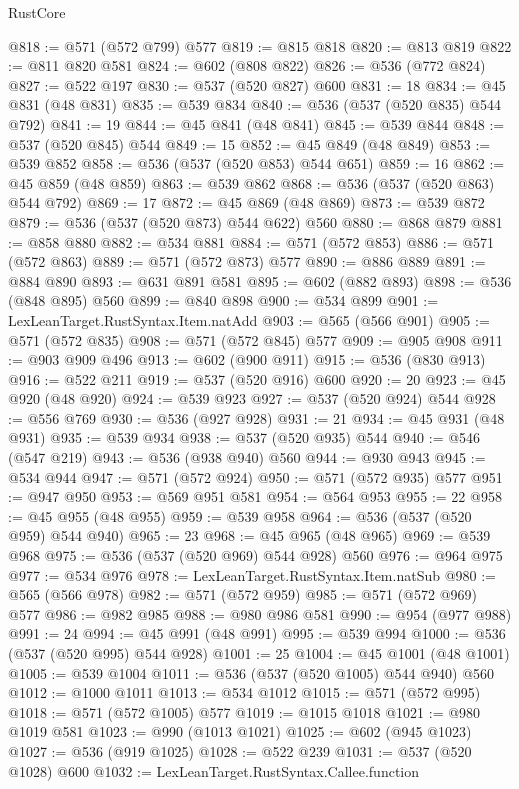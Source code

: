 \begin{lexlean}{RustCore}
\begin{coremodule}
@818 := @571 (@572 @799) @577
@819 := @815 @818
@820 := @813 @819
@822 := @811 @820 @581
@824 := @602 (@808 @822)
@826 := @536 (@772 @824)
@827 := @522 @197
@830 := @537 (@520 @827) @600
@831 := 18
@834 := @45 @831 (@48 @831)
@835 := @539 @834
@840 := @536 (@537 (@520 @835) @544 @792)
@841 := 19
@844 := @45 @841 (@48 @841)
@845 := @539 @844
@848 := @537 (@520 @845) @544
@849 := 15
@852 := @45 @849 (@48 @849)
@853 := @539 @852
@858 := @536 (@537 (@520 @853) @544 @651)
@859 := 16
@862 := @45 @859 (@48 @859)
@863 := @539 @862
@868 := @536 (@537 (@520 @863) @544 @792)
@869 := 17
@872 := @45 @869 (@48 @869)
@873 := @539 @872
@879 := @536 (@537 (@520 @873) @544 @622) @560
@880 := @868 @879
@881 := @858 @880
@882 := @534 @881
@884 := @571 (@572 @853)
@886 := @571 (@572 @863)
@889 := @571 (@572 @873) @577
@890 := @886 @889
@891 := @884 @890
@893 := @631 @891 @581
@895 := @602 (@882 @893)
@898 := @536 (@848 @895) @560
@899 := @840 @898
@900 := @534 @899
@901 := LexLeanTarget.RustSyntax.Item.natAdd
@903 := @565 (@566 @901)
@905 := @571 (@572 @835)
@908 := @571 (@572 @845) @577
@909 := @905 @908
@911 := @903 @909 @496
@913 := @602 (@900 @911)
@915 := @536 (@830 @913)
@916 := @522 @211
@919 := @537 (@520 @916) @600
@920 := 20
@923 := @45 @920 (@48 @920)
@924 := @539 @923
@927 := @537 (@520 @924) @544
@928 := @556 @769
@930 := @536 (@927 @928)
@931 := 21
@934 := @45 @931 (@48 @931)
@935 := @539 @934
@938 := @537 (@520 @935) @544
@940 := @546 (@547 @219)
@943 := @536 (@938 @940) @560
@944 := @930 @943
@945 := @534 @944
@947 := @571 (@572 @924)
@950 := @571 (@572 @935) @577
@951 := @947 @950
@953 := @569 @951 @581
@954 := @564 @953
@955 := 22
@958 := @45 @955 (@48 @955)
@959 := @539 @958
@964 := @536 (@537 (@520 @959) @544 @940)
@965 := 23
@968 := @45 @965 (@48 @965)
@969 := @539 @968
@975 := @536 (@537 (@520 @969) @544 @928) @560
@976 := @964 @975
@977 := @534 @976
@978 := LexLeanTarget.RustSyntax.Item.natSub
@980 := @565 (@566 @978)
@982 := @571 (@572 @959)
@985 := @571 (@572 @969) @577
@986 := @982 @985
@988 := @980 @986 @581
@990 := @954 (@977 @988)
@991 := 24
@994 := @45 @991 (@48 @991)
@995 := @539 @994
@1000 := @536 (@537 (@520 @995) @544 @928)
@1001 := 25
@1004 := @45 @1001 (@48 @1001)
@1005 := @539 @1004
@1011 := @536 (@537 (@520 @1005) @544 @940) @560
@1012 := @1000 @1011
@1013 := @534 @1012
@1015 := @571 (@572 @995)
@1018 := @571 (@572 @1005) @577
@1019 := @1015 @1018
@1021 := @980 @1019 @581
@1023 := @990 (@1013 @1021)
@1025 := @602 (@945 @1023)
@1027 := @536 (@919 @1025)
@1028 := @522 @239
@1031 := @537 (@520 @1028) @600
@1032 := LexLeanTarget.RustSyntax.Callee.function

\end{coremodule}
\end{lexlean}
